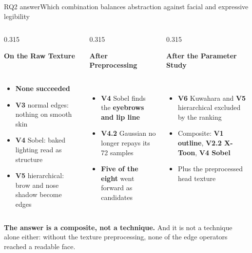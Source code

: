 \documentclass[aspectratio=169,10pt]{beamer}
\newcommand{\hl}[1]{{\color{knblue}\textbf{#1}}}
\newcommand{\good}[1]{{\color{kngreen}\textbf{#1}}}
\newcommand{\bad}[1]{{\color{knred}\textbf{#1}}}
\newcommand{\panelhead}[1]{\noindent\colorbox{kncyan}{\parbox{0.96\textwidth}{\centering\vspace{1pt}\color{white}\scriptsize\bfseries #1\vspace{1pt}}}\\[0.25em]}
\newcommand{\panel}[1]{\noindent\colorbox{knlight}{\parbox{0.96\textwidth}{\vspace{2pt}\scriptsize
\begin{itemize}\setlength{\itemsep}{0.2em}\setlength{\leftmargini}{1.1em}#1\end{itemize}\vspace{2pt}}}}
\begin{document}
\begin{frame}{RQ2 answer}{Which combination balances abstraction against facial and expressive legibility}
  \vspace{0.45em}
  \begin{columns}[T]
    \begin{column}{0.315\textwidth}
      \panelhead{On the Raw Texture}
      \panel{%
        \item \bad{None succeeded}
        \item \textbf{V3} normal edges: nothing on smooth skin
        \item \textbf{V4} Sobel: baked lighting read as structure
        \item \textbf{V5} hierarchical: brow and nose shadow become edges}
    \end{column}
    \begin{column}{0.315\textwidth}
      \panelhead{After Preprocessing}
      \panel{%
        \item \textbf{V4} Sobel finds the \hl{eyebrows and lip line}
        \item \textbf{V4.2} Gaussian no longer repays its 72 samples
        \item \good{Five of the eight} went forward as candidates}
    \end{column}
    \begin{column}{0.315\textwidth}
      \panelhead{After the Parameter Study}
      \panel{%
        \item \bad{V6} Kuwahara and \bad{V5} hierarchical excluded by the ranking
        \item Composite: \hl{V1 outline}, \hl{V2.2 X-Toon}, \hl{V4 Sobel}
        \item Plus the preprocessed head texture}
    \end{column}
  \end{columns}
  \vfill
  \noindent\colorbox{knlight}{\parbox{0.975\textwidth}{\scriptsize\color{knblue}
  \textbf{The answer is a composite, not a technique.} And it is not a technique alone either: without the texture preprocessing, none of the edge operators reached a readable face.}}
\end{frame}
\end{document}
